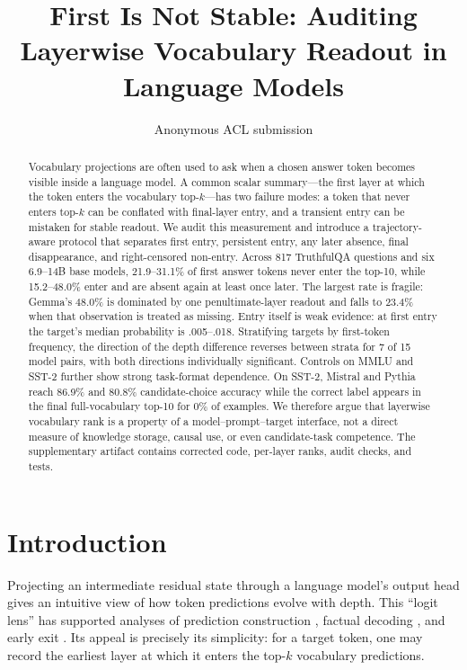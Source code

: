 \documentclass[11pt]{article}
\title{First Is Not Stable: Auditing Layerwise Vocabulary Readout in Language Models}
\author{Anonymous ACL submission}
\begin{document}
\maketitle

\begin{abstract}
Vocabulary projections are often used to ask when a chosen answer token becomes visible inside a language model. A common scalar summary---the first layer at which the token enters the vocabulary top-$k$---has two failure modes: a token that never enters top-$k$ can be conflated with final-layer entry, and a transient entry can be mistaken for stable readout. We audit this measurement and introduce a trajectory-aware protocol that separates first entry, persistent entry, any later absence, final disappearance, and right-censored non-entry. Across 817 TruthfulQA questions and six 6.9--14B base models, 21.9--31.1\% of first answer tokens never enter the top-10, while 15.2--48.0\% enter and are absent again at least once later. The largest rate is fragile: Gemma's 48.0\% is dominated by one penultimate-layer readout and falls to 23.4\% when that observation is treated as missing. Entry itself is weak evidence: at first entry the target's median probability is .005--.018. Stratifying targets by first-token frequency, the direction of the depth difference reverses between strata for 7 of 15 model pairs, with both directions individually significant. Controls on MMLU and SST-2 further show strong task-format dependence. On SST-2, Mistral and Pythia reach 86.9\% and 80.8\% candidate-choice accuracy while the correct label appears in the final full-vocabulary top-10 for 0\% of examples. We therefore argue that layerwise vocabulary rank is a property of a model--prompt--target interface, not a direct measure of knowledge storage, causal use, or even candidate-task competence. The supplementary artifact contains corrected code, per-layer ranks, audit checks, and tests.
\end{abstract}

\section{Introduction}
Projecting an intermediate residual state through a language model's output head gives an intuitive view of how token predictions evolve with depth. This ``logit lens'' has supported analyses of prediction construction \citep{nostalgebraist2020logitlens,geva2022transformer}, factual decoding \citep{chuang2024dola}, and early exit \citep{elhoushi2024layerskip}. Its appeal is precisely its simplicity: for a target token, one may record the earliest layer at which it enters the top-$k$ vocabulary predictions.
\end{document}
